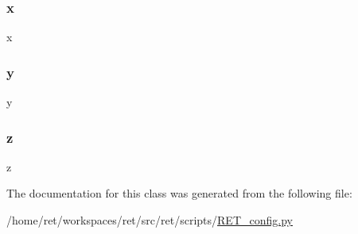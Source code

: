 \subsubsection{\texorpdfstring{x}{x}}
{\footnotesize\ttfamily x}

\mbox{\label{classRET__config_1_1Btn_a2fb1c5cf58867b5bbc9a1b145a86f3a0}} 
\subsubsection{\texorpdfstring{y}{y}}
{\footnotesize\ttfamily y}

\mbox{\label{classRET__config_1_1Btn_a25ed1bcb423b0b7200f485fc5ff71c8e}} 
\subsubsection{\texorpdfstring{z}{z}}
{\footnotesize\ttfamily z}



The documentation for this class was generated from the following file\+:\begin{DoxyCompactItemize}
\item 
/home/ret/workspaces/ret/src/ret/scripts/\hyperlink{RET__config_8py}{R\+E\+T\+\_\+config.\+py}\end{DoxyCompactItemize}
